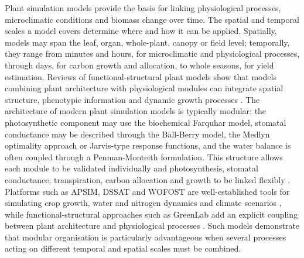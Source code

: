 \documentclass[a4paper,fleqn]{cas-sc}
\begin{document}
Plant simulation models provide the basis for linking physiological processes, microclimatic conditions and biomass change over time. The spatial and temporal scales a model covers determine where and how it can be applied. Spatially, models may span the leaf, organ, whole-plant, canopy or field level; temporally, they range from minutes and hours, for microclimatic and physiological processes, through days, for carbon growth and allocation, to whole seasons, for yield estimation. Reviews of functional-structural plant models show that models combining plant architecture with physiological modules can integrate spatial structure, phenotypic information and dynamic growth processes \cite{Louarn2020,Sievnen2014}. The architecture of modern plant simulation models is typically modular: the photosynthetic component may use the biochemical Farquhar model, stomatal conductance may be described through the Ball-Berry model, the Medlyn optimality approach or Jarvis-type response functions, and the water balance is often coupled through a Penman-Monteith formulation. This structure allows each module to be validated individually and photosynthesis, stomatal conductance, transpiration, carbon allocation and growth to be linked flexibly \cite{Farquhar1980,Ball1987,Medlyn2011,Jarvis1976,Allen1998,Kim2003}. Platforms such as APSIM, DSSAT and WOFOST are well-established tools for simulating crop growth, water and nitrogen dynamics and climate scenarios \cite{Holzworth2014,Jones2003,deWit2019}, while functional-structural approaches such as GreenLab add an explicit coupling between plant architecture and physiological processes \cite{DeReffye2020}. Such models demonstrate that modular organisation is particularly advantageous when several processes acting on different temporal and spatial scales must be combined.
\end{document}
